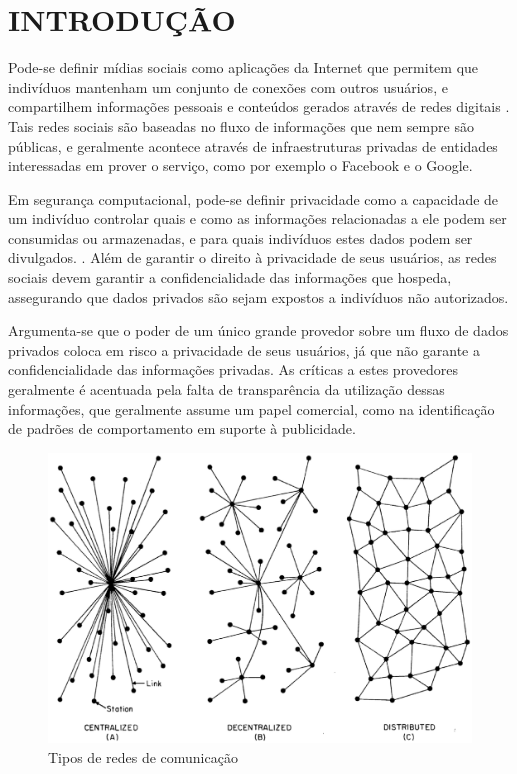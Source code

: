 \chapter{INTRODUÇÃO}

Pode-se definir mídias sociais como aplicações da Internet que permitem que
indivíduos mantenham um conjunto de conexões com outros usuários, e compartilhem
informações pessoais e conteúdos gerados através de redes digitais \cite{boyd2007}.
Tais redes sociais são baseadas no fluxo de informações que nem sempre são públicas,
e geralmente acontece através de infraestruturas privadas de entidades interessadas
em prover o serviço, como por exemplo o Facebook e o Google. 

Em segurança computacional, pode-se definir privacidade como a capacidade de um
indivíduo controlar quais e como as informações relacionadas a ele podem ser
consumidas ou armazenadas, e para quais indivíduos estes dados podem ser divulgados.
\cite{stallings2010}. Além de garantir o direito à privacidade de seus usuários,
as redes sociais devem garantir a confidencialidade das informações que hospeda,
assegurando que dados privados são sejam expostos a indivíduos não autorizados.

Argumenta-se que o poder de um único grande provedor sobre um fluxo de dados
privados coloca em risco a privacidade de seus usuários, já que não garante a
confidencialidade das informações privadas. As críticas a estes provedores
geralmente é acentuada pela falta de transparência da utilização dessas informações,
que geralmente assume um papel comercial, como na identificação de padrões de
comportamento em suporte à publicidade. 

\begin{figure}[h]
	\centering
		\includegraphics[keepaspectratio=true,scale=0.6]{figuras/org_redes.eps}
	\caption{Tipos de redes de comunicação \cite{baran1964}}
	\label{fig:org_redes}
\end{figure}

